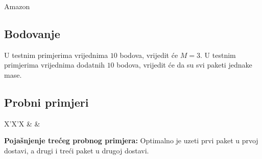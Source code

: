 \begin{statement}[
  problempoints=30,
  timelimit=1 sekunda,
  memorylimit=512 MiB,
]{Amazon}
\subsection*{Bodovanje}
U testnim primjerima vrijednima $10$ bodova, vrijedit će $M=3$.
U testnim primjerima vrijednima dodatnih $10$ bodova, vrijedit će da su svi
paketi jednake mase.

\subsection*{Probni primjeri}
\begin{tabularx}{\textwidth}{X'X'X}
 &
 &
\end{tabularx}

\textbf{Pojašnjenje trećeg probnog primjera:}
Optimalno je uzeti prvi paket u prvoj dostavi, a drugi i treći paket u drugoj
dostavi.

\end{statement}

